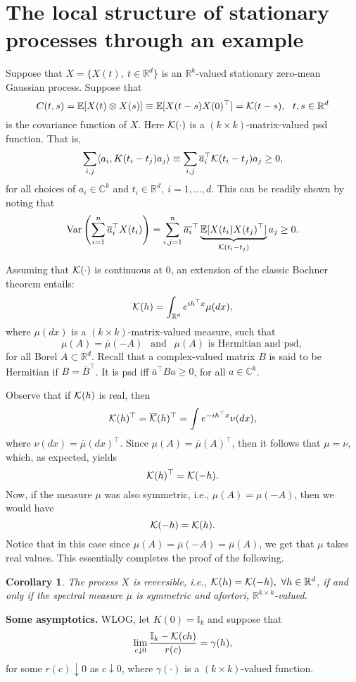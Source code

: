 \documentclass[11pt]{article}
\def\E{\mathbb E}
\def\I{\mathbb I}
\def\R{\mathbb R}
\def\Rd{\R^d}
\theoremstyle{plain}
\newtheorem{corollary}[theorem]{Corollary}
\theoremstyle{definition}
\theoremstyle{condition}
\theoremstyle{remark}
\begin{document}
\section{The local structure of stationary processes through an example}

Suppose that $X = \{X(t),\ t\in\Rd\}$ is an $\R^k$-valued stationary zero-mean Gaussian process.  Suppose that
$$
C(t,s) = \E [X(t)\otimes X(s)] \equiv \E [X(t-s) X(0)^\top] = {\cal K}(t-s),\ \ t,s\in\Rd
$$
is the covariance function of $X$.  Here ${\cal K}(\cdot)$ is a $(k\times k)$-matrix-valued psd function.  That is,
$$
\sum_{i,j} \langle a_i, K(t_i - t_j) a_j\rangle \equiv \sum_{i,j} \overline a_i^\top {\cal K}(t_i-t_j) a_j \ge 0,
$$
for all choices of $a_i \in \mathbb C^k$ and $t_i\in\Rd,\ i=1,\dots,d$.  This can be readily shown by noting that
$$
{\rm Var} \left( \sum_{i=1}^n \overline a_i^\top X(t_i) \right) = \sum_{i,j=1}^n \overline{a_i}^\top\underbrace{\E [X(t_i)X(t_j)^\top]}_{{\cal K}(t_i-t_j)} a_j \ge 0.
$$

Assuming that ${\cal K}(\cdot)$ is continuous at $0$, an extension of the classic Bochner theorem entails:
$$
{\cal K}(h) = \int_{\Rd} e^{i h^\top x} \mu(dx),
$$
where $\mu(dx)$ is a $(k\times k)$-matrix-valued measure, such that
$$
\mu(A) = \overline\mu(-A)\ \ \mbox{ and }\ \ \mu(A) \mbox{ is Hermitian and psd, }
$$
for all Borel $A\subset \R^d$.  Recall that a complex-valued matrix $B$ is said to be Hermitian if $B = \overline {B}^\top$.  It is psd 
iff $\overline a^\top  B a \ge 0$, for all $a\in {\mathbb C}^k$.


Observe that  if ${\cal K}(h)$ is real, then
$$
{\cal K}(h)^\top = \overline {\cal K}(h)^\top = \int e^{-ih^\top x} \nu(dx),
$$
where $\nu(dx) = \overline \mu(dx)^\top$. Since $\mu(A) = \overline \mu(A)^\top$, then it follows that $\mu= \nu$, which, as expected, yields
$$
{\cal K}(h)^\top = {\cal K}(-h).
$$ 
Now, if the measure $\mu$ was also symmetric, i.e., $\mu(A) = \mu(-A)$, then we would have
$$
{\cal K}(-h) = {\cal K}(h).
$$
Notice that in this case since $\mu(A) = \overline\mu(-A) = \overline \mu(A)$, we get that $\mu$ takes real values.  This essentially
completes the proof of the following.

\begin{corollary} The process $X$ is reversible, i.e., ${\cal K}(h) = {\cal K}(-h),\ \forall h\in\Rd$, if and only if
the spectral measure $\mu$ is symmetric and afortori, $\R^{k\times k}$-valued.
\end{corollary}

\medskip
{\bf Some asymptotics.}  WLOG, let $K(0)=\I_k$ and suppose  that 
\begin{equation}\label{e:K-to-gamma}
 \lim_{c\downarrow 0} \frac{\I_k - {\cal K}(ch)}{r(c)} = \gamma(h),
\end{equation}
for some $r(c)\downarrow 0$ as $c\downarrow 0$, where $\gamma(\cdot)$ is a $(k\times k)$-valued function.
\end{document}
